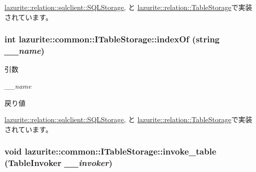 \hyperlink{classlazurite_1_1relation_1_1sqlclient_1_1_s_q_l_storage_a9c45c2be1c07d8c13d735dfc62a765c3}{lazurite::relation::sqlclient::SQLStorage}, と \hyperlink{classlazurite_1_1relation_1_1_table_storage_a1de112fe907e377581cea36721cf88c3}{lazurite::relation::TableStorage}で実装されています。\hypertarget{interfacelazurite_1_1common_1_1_i_table_storage_af50cc04c6deb3b470182f1f076355526}{
\subsubsection[{indexOf}]{\setlength{\rightskip}{0pt plus 5cm}int lazurite::common::ITableStorage::indexOf (string {\em \_\-\_\-name})}}
\label{interfacelazurite_1_1common_1_1_i_table_storage_af50cc04c6deb3b470182f1f076355526}

\begin{DoxyParams}{引数}
\item[{\em \_\-\_\-name}]\end{DoxyParams}
\begin{DoxyReturn}{戻り値}

\end{DoxyReturn}


\hyperlink{classlazurite_1_1relation_1_1sqlclient_1_1_s_q_l_storage_a51138a6b8e2e5c1c30b92a0eb02c0550}{lazurite::relation::sqlclient::SQLStorage}, と \hyperlink{classlazurite_1_1relation_1_1_table_storage_a34ba464646b611d991ab71cc063e908a}{lazurite::relation::TableStorage}で実装されています。\hypertarget{interfacelazurite_1_1common_1_1_i_table_storage_a7ae87b836b9490c25ebd6c20ea8429b7}{
\subsubsection[{invoke\_\-table}]{\setlength{\rightskip}{0pt plus 5cm}void lazurite::common::ITableStorage::invoke\_\-table (TableInvoker {\em \_\-\_\-invoker})}}
\label{interfacelazurite_1_1common_1_1_i_table_storage_a7ae87b836b9490c25ebd6c20ea8429b7}

